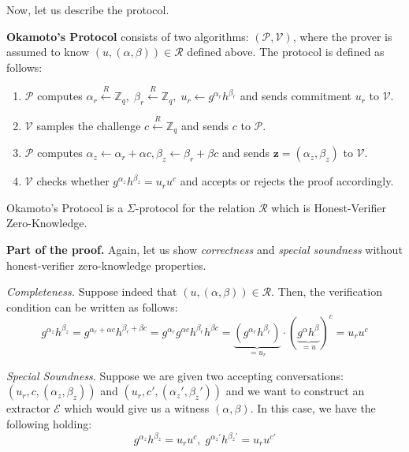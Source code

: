 \documentclass[../lecture-notes-148x210.tex]{subfiles}
\begin{document}
Now, let us describe the protocol.

\begin{definition}
    \textbf{Okamoto's Protocol} consists of two algorithms: $(\mathcal{P}, \mathcal{V})$, where the prover is assumed to know $(u,(\alpha,\beta)) \in \mathcal{R}$ defined above. The protocol is defined as follows:
    \begin{enumerate}
        \item $\mathcal{P}$ computes $\alpha_r \xleftarrow{R} \mathbb{Z}_q, \; \beta_r \xleftarrow{R} \mathbb{Z}_q, \; u_r \gets g^{\alpha_r}h^{\beta_r}$ and sends commitment $u_r$ to $\mathcal{V}$.
        \item $\mathcal{V}$ samples the challenge $c \xleftarrow{R} \mathbb{Z}_q$ and sends $c$ to $\mathcal{P}$.
        \item $\mathcal{P}$ computes $\alpha_z \gets \alpha_r + \alpha c, \beta_z \gets \beta_r + \beta c$ and sends $\mathbf{z} = (\alpha_z,\beta_z)$ to $\mathcal{V}$.
        \item $\mathcal{V}$ checks whether $g^{\alpha_z}h^{\beta_z} = u_r u^c$ and accepts or rejects the proof accordingly.
    \end{enumerate}
\end{definition}

\begin{theorem}
    Okamoto's Protocol is a $\Sigma$-protocol for the relation $\mathcal{R}$ which is Honest-Verifier Zero-Knowledge.
\end{theorem}

\textbf{Part of the proof.} Again, let us show \textit{correctness} and \textit{special soundness} without honest-verifier zero-knowledge properties.

\textit{Completeness.} Suppose indeed that $(u,(\alpha,\beta)) \in \mathcal{R}$. Then, the verification condition can be written as follows:
\begin{equation*}
    g^{\alpha_z}h^{\beta_z} = g^{\alpha_r + \alpha c}h^{\beta_r + \beta c} = g^{\alpha_r}g^{\alpha c}h^{\beta_r}h^{\beta c} = \underbrace{(g^{\alpha_r}h^{\beta_r})}_{=u_r} \cdot (\underbrace{g^{\alpha}h^{\beta}}_{=u})^c = u_r u^c
\end{equation*}

\textit{Special Soundness}. Suppose we are given two accepting conversations: $(u_r,c,(\alpha_z,\beta_z))$ and $(u_r,c',(\alpha_z',\beta_z'))$ and we want to construct an extractor $\mathcal{E}$ which would give us a witness $(\alpha,\beta)$. In this case, we have the following holding:
\begin{equation*}
    g^{\alpha_z}h^{\beta_z} = u_r u^c, \; g^{\alpha_z'}h^{\beta_z'} = u_r u^{c'}
\end{equation*}
\end{document}
